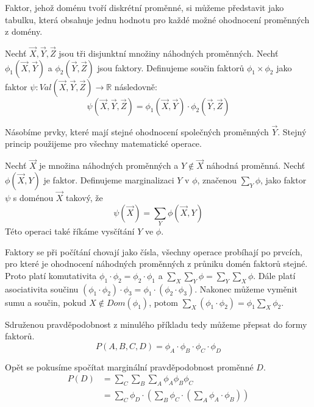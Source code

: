 Faktor, jehož doménu tvoří diskrétní proměnné, si můžeme představit jako tabulku, která obsahuje jednu hodnotu pro každé možné ohodnocení proměnných z domény.

\begin{definice}
Nechť $\vec{X}, \vec{Y}, \vec{Z}$ jsou tři disjunktní množiny náhodných proměnných.
Nechť $\phi_1(\vec{X}, \vec{Y})$ a $\phi_2(\vec{Y}, \vec{Z})$ jsou faktory.
Definujeme součin faktorů $\phi_1 \times \phi_2$ jako faktor $\psi: Val(\vec{X}, \vec{Y}, \vec{Z}) \rightarrow \mathbb{R}$ následovně:
\begin{equation*}
\psi(\vec{X}, \vec{Y}, \vec{Z}) = \phi_1(\vec{X}, \vec{Y}) \cdot \phi_2(\vec{Y}, \vec{Z})
\end{equation*}
\end{definice}

Násobíme prvky, které mají stejné ohodnocení společných proměnných $\vec{Y}$.
Stejný princip použijeme pro všechny matematické operace.

\begin{definice}
Nechť $\vec{X}$ je množina náhodných proměnných a $Y \not\in \vec{X}$ náhodná proměnná. 
Nechť $\phi(\vec{X}, Y)$ je faktor.
Definujeme marginalizaci $Y$ v $\phi$, značenou $\sum_Y \phi$, jako faktor $\psi$ s doménou $\vec{X}$ takový, že
\begin{equation*}
    \psi(\vec{X}) = \sum_Y \phi(\vec{X}, Y)
\end{equation*}
Této operaci také říkáme vysčítání $Y$ ve $\phi$.
\end{definice}

Faktory se při počítání chovají jako čísla, všechny operace probíhají po prvcích, pro které je ohodnocení náhodných proměnných z průniku domén faktorů stejné.
Proto platí komutativita $\phi_1 \cdot \phi_2 = \phi_2 \cdot \phi_1$ a $\sum_X \sum_Y \phi = \sum_Y \sum_X \phi$.
Dále platí asociativita součinu $(\phi_1 \cdot \phi_2) \cdot \phi_3 = \phi_1 \cdot (\phi_2 \cdot \phi_3)$.
Nakonec můžeme vyměnit sumu a součin, pokud $X \not\in Dom(\phi_1)$, potom $\sum_X (\phi_1 \cdot \phi_2) = \phi_1 \sum_X \phi_2$.

Sdruženou pravděpodobnost z minulého příkladu tedy můžeme přepsat do formy faktorů.
\begin{equation}
    P(A, B, C, D) = \phi_A \cdot \phi_B \cdot \phi_C \cdot \phi_D
\end{equation}

Opět se pokusíme spočítat marginální pravděpodobnost proměnné $D$.
\begin{align}
P(D) &= \sum_C \sum_B \sum_A \phi_A \phi_B \phi_C
\\
&= \sum_C 
	\phi_D \cdot 
	\left( 
		\sum_B 
			\phi_C \cdot 
			\left( 
				\sum_A 
					\phi_A \cdot \phi_B
			\right)
	\right)
\end{align}

